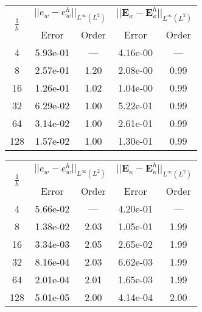 \begin{table}[hp]
	\centering
	\begin{tabular}{ccccc}
		\hline 
		\multirow{2}{*}{$\frac{1}{h}$} & \multicolumn{2}{c}{$||e_w - e_w^h||_{L^{\infty}(L^2)}$}  & \multicolumn{2}{c}{$||\bm{E}_\kappa - \bm{E}_\kappa^h||_{L^{\infty}(L^2)}$}   \\ 
		& Error & Order  & Error & Order  \\
		\hline 
		4  & 5.93e-01 & ---  & 4.16e-00 & ---  \\ 
		8  & 2.57e-01 & 1.20 & 2.08e-00 & 0.99 \\ 
		16 & 1.26e-01 & 1.02 & 1.04e-00 & 0.99 \\ 
		32 & 6.29e-02 & 1.00 & 5.22e-01 & 0.99 \\ 
		64 & 3.14e-02 & 1.00 & 2.61e-01 & 0.99 \\ 
		128& 1.57e-02 & 1.00 & 1.30e-01 & 0.99 \\
		\hline 
	\end{tabular} 
	\captionsetup{width=0.95\linewidth}
	\vspace{1mm}
	\label{tab:resebCGCG_k1}
\end{table}	

\begin{table}[hp]
	\centering
	\begin{tabular}{ccccc}
		\hline 
		\multirow{2}{*}{$\frac{1}{h}$} & \multicolumn{2}{c}{$||e_w - e_w^h||_{L^{\infty}(L^2)}$}  & \multicolumn{2}{c}{$||\bm{E}_\kappa - \bm{E}_\kappa^h||_{L^{\infty}(L^2)}$}   \\ 
		& Error & Order  & Error & Order  \\
		\hline 
		4  & 5.66e-02 & ---  & 4.20e-01 & ---  \\ 
		8  & 1.38e-02 & 2.03 & 1.05e-01 & 1.99 \\ 
		16 & 3.34e-03 & 2.05 & 2.65e-02 & 1.99 \\ 
		32 & 8.16e-04 & 2.03 & 6.62e-03 & 1.99 \\ 
		64 & 2.01e-04 & 2.01 & 1.65e-03 & 1.99 \\ 
		128& 5.01e-05 & 2.00 & 4.14e-04 & 2.00 \\
		\hline 
	\end{tabular} 
	\captionsetup{width=0.95\linewidth}
	\vspace{1mm}
	\label{tab:resebCGCG_k2}
\end{table}	

